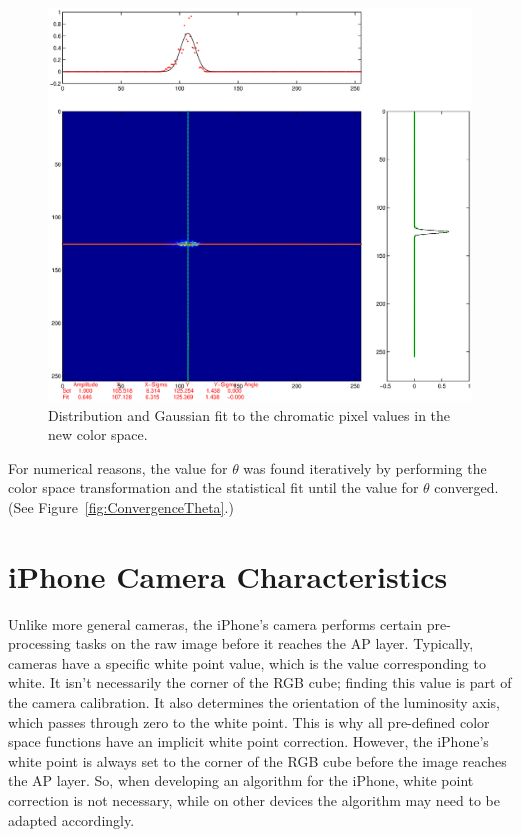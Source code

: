 \begin{figure}[h!]
  \centering
    \includegraphics[width=\textwidth]{Chapter3/Figs/crosshairFigureFinal.eps}
    \caption{Distribution and Gaussian fit to the chromatic pixel values in the new color space.}  \label{fig:DistributionAndGaussianFit}
\end{figure}


For numerical reasons, the value for $\theta$ was found iteratively by performing the color space transformation and the statistical fit until the value for $\theta$ converged. (See Figure~\ref{fig:ConvergenceTheta}.)

\section{iPhone Camera Characteristics} \label{sec:iPhoneCameraCharacteristics}

Unlike more general cameras, the iPhone's camera performs certain pre-processing tasks on the raw image before it reaches the AP layer. Typically, cameras have a specific white point value, which is the value corresponding to white. It isn't necessarily the corner of the RGB cube; finding this value is part of the camera calibration. It also determines the orientation of the luminosity axis, which passes through zero to the white point. This is why all pre-defined color space functions have an implicit white point correction. However, the iPhone's white point is always set to the corner of the RGB cube before the image reaches the AP layer. So, when developing an algorithm for the iPhone, white point correction is not necessary, while on other devices the algorithm may need to be adapted accordingly.

